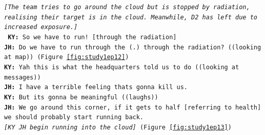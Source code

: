 \noindent\texttt{\emph{[The team tries to go around the cloud but is stopped by radiation, realising their target is in the cloud. Meanwhile, D2 has left due to increased exposure.]\\}
\textbf{KY:} So we have to run! [through the radiation] \\
\textbf{JH:} Do we have to run through the (.) through the radiation? ((looking at map)) (Figure \ref{fig:study1ep12})\\
\textbf{KY:} Yah this is what the headquarters told us to do ((looking at messages)) \\
\textbf{JH:} I have a terrible feeling thats gonna kill us.\\
\textbf{KY:} But its gonna be meaningful ((laughs))\\
\textbf{JH:} We go around this corner, if it gets to half [referring to health] we should probably start running back.\\
\emph{ [KY JH begin running into the cloud] } (Figure \ref{fig:study1ep13})
}

